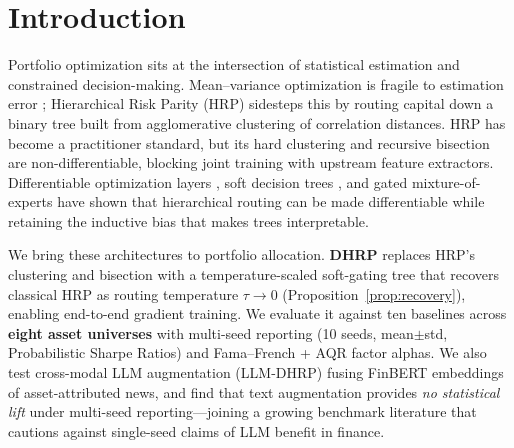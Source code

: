 \section{Introduction}
\label{sec:intro}

Portfolio optimization sits at the intersection of statistical estimation
and constrained decision-making. Mean--variance optimization
\citep{Markowitz1952} is fragile to estimation error
\citep{DeMiguel2009,Ledoit2004}; Hierarchical Risk Parity (HRP)
\citep{LopezdePrado2016} sidesteps this by routing capital down a binary
tree built from agglomerative clustering of correlation distances. HRP
has become a practitioner standard, but its hard clustering and
recursive bisection are non-differentiable, blocking joint training
with upstream feature extractors. Differentiable optimization layers
\citep{Amos2017,Agrawal2019,Bolte2021,Pan2024BPQP}, soft decision trees
\citep{FrosstHinton2017,Popov2020NODE,Mao2025DiffTree}, and gated
mixture-of-experts \citep{Shazeer2017} have shown that hierarchical
routing can be made differentiable while retaining the inductive bias
that makes trees interpretable.

We bring these architectures to portfolio allocation. \textbf{DHRP}
replaces HRP's clustering and bisection with a temperature-scaled
soft-gating tree that recovers classical HRP as routing temperature
$\tau \to 0$ (Proposition~\ref{prop:recovery}), enabling end-to-end
gradient training. We evaluate it against ten baselines across
\textbf{eight asset universes} with multi-seed reporting (10 seeds,
mean$\pm$std, Probabilistic Sharpe Ratios) and Fama--French + AQR
factor alphas. We also test cross-modal LLM augmentation (LLM-DHRP)
fusing FinBERT \citep{Huang2023} embeddings of asset-attributed news,
and find that text augmentation provides \emph{no statistical lift}
under multi-seed reporting---joining a growing benchmark literature
\citep{Tan2024AreLMs,Chen2025StockBench,Xie2024FinBen} that cautions
against single-seed claims of LLM benefit in finance.

